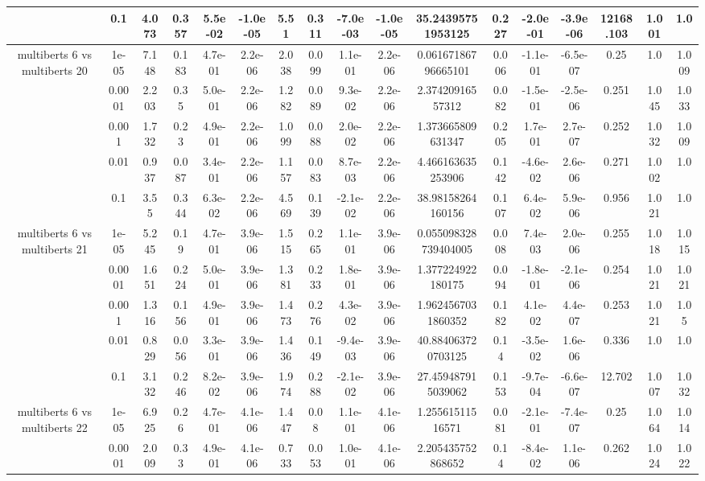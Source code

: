 \begin{tabular}{|c|c|c|c|c|c|c|c|c|c|c|c|c|c|c|c|c|}
 & 0.1 & 4.073 & 0.357 & 5.5e-02 & -1.0e-05 & 5.51 & 0.311 & -7.0e-03 & -1.0e-05 & 35.24395751953125 & 0.227 & -2.0e-01 & -3.9e-06 & 12168.103 & 1.001 & 1.0 \\
\hline
\multirow{5}{*}{multiberts 6 vs multiberts 20} & 1e-05 & 7.148 & 0.183 & 4.7e-01 & 2.2e-06 & 2.038 & 0.099 & 1.1e-01 & 2.2e-06 & 0.06167186796665101 & 0.006 & -1.1e-01 & -6.5e-07 & 0.25 & 1.0 & 1.009 \\
 & 0.0001 & 2.203 & 0.35 & 5.0e-01 & 2.2e-06 & 1.282 & 0.089 & 9.3e-02 & 2.2e-06 & 2.37420916557312 & 0.082 & -1.5e-01 & -2.5e-06 & 0.251 & 1.045 & 1.033 \\
 & 0.001 & 1.732 & 0.23 & 4.9e-01 & 2.2e-06 & 1.099 & 0.088 & 2.0e-02 & 2.2e-06 & 1.373665809631347 & 0.205 & 1.7e-01 & 2.7e-07 & 0.252 & 1.032 & 1.009 \\
 & 0.01 & 0.937 & 0.087 & 3.4e-01 & 2.2e-06 & 1.157 & 0.083 & 8.7e-03 & 2.2e-06 & 4.466163635253906 & 0.142 & -4.6e-02 & 2.6e-06 & 0.271 & 1.002 & 1.0 \\
 & 0.1 & 3.55 & 0.344 & 6.3e-02 & 2.2e-06 & 4.569 & 0.139 & -2.1e-02 & 2.2e-06 & 38.98158264160156 & 0.107 & 6.4e-02 & 5.9e-06 & 0.956 & 1.021 & 1.0 \\
\hline
\multirow{5}{*}{multiberts 6 vs multiberts 21} & 1e-05 & 5.245 & 0.19 & 4.7e-01 & 3.9e-06 & 1.515 & 0.265 & 1.1e-01 & 3.9e-06 & 0.055098328739404005 & 0.008 & 7.4e-03 & 2.0e-06 & 0.255 & 1.018 & 1.015 \\
 & 0.0001 & 1.651 & 0.224 & 5.0e-01 & 3.9e-06 & 1.381 & 0.233 & 1.8e-01 & 3.9e-06 & 1.377224922180175 & 0.094 & -1.8e-01 & -2.1e-06 & 0.254 & 1.021 & 1.021 \\
 & 0.001 & 1.316 & 0.156 & 4.9e-01 & 3.9e-06 & 1.473 & 0.276 & 4.3e-02 & 3.9e-06 & 1.9624567031860352 & 0.182 & 4.1e-02 & 4.4e-07 & 0.253 & 1.021 & 1.05 \\
 & 0.01 & 0.829 & 0.056 & 3.3e-01 & 3.9e-06 & 1.436 & 0.149 & -9.4e-03 & 3.9e-06 & 40.884063720703125 & 0.14 & -3.5e-02 & 1.6e-06 & 0.336 & 1.0 & 1.0 \\
 & 0.1 & 3.132 & 0.246 & 8.2e-02 & 3.9e-06 & 1.974 & 0.288 & -2.1e-02 & 3.9e-06 & 27.459487915039062 & 0.153 & -9.7e-04 & -6.6e-07 & 12.702 & 1.007 & 1.032 \\
\hline
\multirow{5}{*}{multiberts 6 vs multiberts 22} & 1e-05 & 6.925 & 0.26 & 4.7e-01 & 4.1e-06 & 1.447 & 0.08 & 1.1e-01 & 4.1e-06 & 1.25561511516571 & 0.081 & -2.1e-01 & -7.4e-07 & 0.25 & 1.064 & 1.014 \\
 & 0.0001 & 2.009 & 0.33 & 4.9e-01 & 4.1e-06 & 0.733 & 0.053 & 1.0e-01 & 4.1e-06 & 2.205435752868652 & 0.14 & -8.4e-02 & 1.1e-06 & 0.262 & 1.024 & 1.022 \\

\end{tabular}
